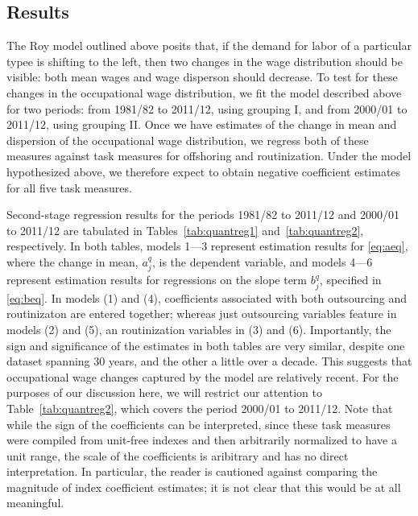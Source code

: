 \subsection{Results}

The Roy model outlined above posits that, if the demand for labor of a particular typee is shifting to the left, then two changes in the wage distribution should be visible: both mean wages and wage disperson should decrease. To test for these changes in the occupational wage distribution, we fit the model described above for two periods: from 1981/82 to 2011/12, using grouping I, and from 2000/01 to 2011/12, using grouping II. Once we have estimates of the change in mean and dispersion of the occupational wage distribution, we regress both of these measures against task measures for offshoring and routinization. Under the model hypothesized above, we therefore expect to obtain negative coefficient estimates for all five task measures.

Second-stage regression results for the periods 1981/82 to 2011/12 and 2000/01 to 2011/12 are tabulated in Tables~\ref{tab:quantreg1} and~\ref{tab:quantreg2}, respectively. In both tables, models 1---3 represent estimation results for \eqref{eq:aeq}, where the change in mean, $a_j^q$, is the dependent variable, and models 4---6 represent estimation results for regressions on the slope term $b_j^q$, specified in \eqref{eq:beq}. In models (1) and (4), coefficients associated with both outsourcing and routinizaton are entered together; whereas just outsourcing variables feature in models (2) and (5), an routinization variables in (3) and (6). Importantly, the sign and significance of the estimates in both tables are very similar, despite one dataset spanning 30 years, and the other a little over a decade. This suggests that occupational wage changes captured by the model are relatively recent. For the purposes of our discussion here, we will restrict our attention to Table~\ref{tab:quantreg2}, which covers the period 2000/01 to 2011/12. Note that while the sign of the coefficients can be interpreted, since these task measures were compiled from unit-free indexes and then arbitrarily normalized to have a unit range, the scale of the coefficients is aribitrary and has no direct interpretation. In particular, the reader is cautioned against comparing the magnitude of index coefficient estimates; it is not clear that this would be at all meaningful.





